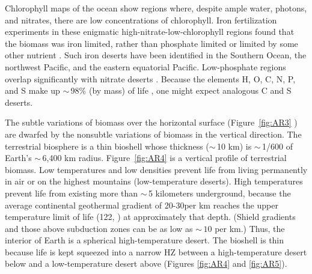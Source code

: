 Chlorophyll maps of the ocean \citep{McClain2006,McClain2009} show regions where, despite ample water, photons, and nitrates, there are low concentrations of chlorophyll. Iron fertilization experiments in these enigmatic high-nitrate-low-chlorophyll regions found that the biomass was iron limited, rather than phosphate limited or limited by some other nutrient \citep{Falkowski1998, Smetacek2008}. Such iron deserts have been identified in the Southern Ocean, the northwest Pacific, and the eastern equatorial Pacific. Low-phosphate regions overlap significantly with nitrate deserts \citep{Garcia2006}. Because the elements H, O, C, N, P, and S make up $\sim$\,98\% (by mass) of life \citep{Lineweaver2012}, one might expect analogous C and S deserts.

The subtle variations of biomass over the horizontal surface (Figure~\ref{fig:AR3} ) are dwarfed by the nonsubtle variations of biomass in the vertical direction. The terrestrial biosphere is a thin bioshell whose thickness ($\sim$\,10 km) is $\sim$\,1/600 of Earth's $\sim$\,6,400 km radius. Figure~\ref{fig:AR4}  is a vertical profile of terrestrial biomass. Low temperatures and low densities prevent life from living permanently in air or on the highest mountains (low-temperature deserts). High temperatures prevent life from existing more than $\sim$\,5 kilometers underground, because the average continental geothermal gradient of 20{-}30\textcelsius per km reaches the upper temperature limit of life (122\textcelsius{}, \citep{Takai2008}) at approximately that depth. (Shield gradients and those above subduction zones can be as low as $\sim$\,$10$\textcelsius{} per km.) Thus, the interior of Earth is a spherical high-temperature desert. The bioshell is thin because life is kept squeezed into a narrow HZ between a high-temperature desert below and a low-temperature desert above (Figures \ref{fig:AR4} and \ref{fig:AR5}). 

